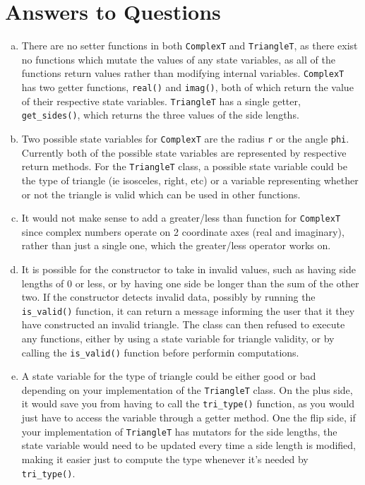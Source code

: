 \documentclass[12pt]{article}
\begin{document}
\section{Answers to Questions}

\begin{enumerate}[(a)]

\item There are no setter functions in both \verb|ComplexT| and \verb|TriangleT|, as there exist no functions which mutate the values of any state variables, as all of the functions return values rather than modifying internal variables. \verb|ComplexT| has two getter functions, \verb|real()| and \verb|imag()|, both of which return the value of their respective state variables. \verb|TriangleT| has a single getter, \verb|get_sides()|, which returns the three values of the side lengths. 	
\item Two possible state variables for \verb|ComplexT| are the radius \verb|r| or the angle \verb|phi|. Currently both of the possible state variables are represented by respective return methods. For the \verb|TriangleT| class, a possible state variable could be the type of triangle (ie isosceles, right, etc) or a variable representing whether or not the triangle is valid which can be used in other functions. 
\item It would not make sense to add a greater/less than function for \verb|ComplexT| since complex numbers operate on 2 coordinate axes (real and imaginary), rather than just a single one, which the greater/less operator works on. 
\item It is possible for the constructor to take in invalid values, such as having side lengths of 0 or less, or by having one side be longer than the sum of the other two. If the constructor detects invalid data, possibly by running the \verb|is_valid()| function, it can return a message informing the user that it they have constructed an invalid triangle. The class can then refused to execute any functions, either by using a state variable for triangle validity, or by calling the \verb|is_valid()| function before performin computations.
\item A state variable for the type of triangle could be either good or bad depending on your implementation of the \verb|TriangleT| class. On the plus side, it would save you from having to call the \verb|tri_type()| function, as you would just have to access the variable through a getter method. One the flip side, if your implementation of \verb|TriangleT| has mutators for the side lengths, the state variable would need to be updated every time a side length is modified, making it easier just to compute the type whenever it's needed by \verb|tri_type()|.	

\end{enumerate}
\end{document}
